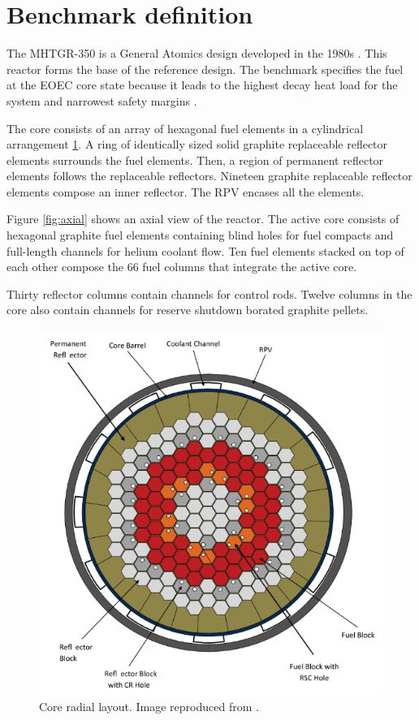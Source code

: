 \documentclass{anstrans}
\begin{document}
\section{Benchmark definition}

The MHTGR-350 is a General Atomics design developed in the 1980s \cite{silady_licensing_1988}.
This reactor forms the base of the reference design.
The benchmark specifies the fuel at the \gls{EOEC} core state because it leads to the highest decay heat load for the system and narrowest safety margins \cite{oecd_nea_benchmark_2017}.

The core consists of an array of hexagonal fuel elements in a cylindrical arrangement \ref{fig:radial}.
A ring of identically sized solid graphite replaceable reflector elements surrounds the fuel elements.
Then, a region of permanent reflector elements follows the replaceable reflectors.
Nineteen graphite replaceable reflector elements compose an inner reflector.
The RPV encases all the elements.

Figure \ref{fig:axial} shows an axial view of the reactor.
The active core consists of hexagonal graphite fuel elements containing blind holes for fuel compacts and full-length channels for helium coolant flow.
Ten fuel elements stacked on top of each other compose the 66 fuel columns that integrate the active core.

Thirty reflector columns contain channels for control rods.
Twelve columns in the core also contain channels for reserve shutdown borated graphite pellets.

\begin{figure}[htbp!] %
	\centering
	\includegraphics[width=0.95\linewidth]{figures/radial-layout.png}
	\hfill
	\caption{Core radial layout. Image reproduced from \cite{oecd_nea_benchmark_2017}.}
	\label{fig:radial}
\end{figure}
\end{document}
